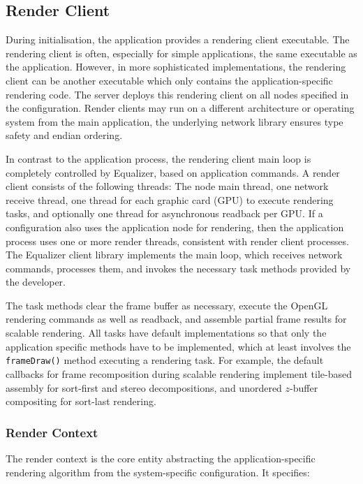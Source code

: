 \subsection{Render Client}

During initialisation, the application provides a rendering client executable.
The rendering client is often, especially for simple applications, the same
executable as the application. However, in more sophisticated implementations,
the rendering client can be another executable which only contains the
application-specific rendering code. The server deploys this rendering client
on all nodes specified in the configuration. Render clients may run on a
different architecture or operating system from the main application, the
underlying network library ensures type safety and endian ordering.

In contrast to the application process, the rendering client main loop is
completely controlled by Equalizer, based on application commands. A render
client consists of the following threads: The node main thread, one network
receive thread, one thread for each graphic card (GPU) to execute rendering
tasks, and optionally one thread for asynchronous readback per GPU. If a
configuration also uses the application node for rendering, then the
application process uses one or more render threads, consistent with render
client processes. The Equalizer client library implements the main loop, which
receives network commands, processes them, and invokes the necessary task
methods provided by the developer.

The task methods clear the frame buffer as necessary, execute the OpenGL
rendering commands as well as readback, and assemble partial frame results for
scalable rendering. All tasks have default implementations so that only the
application specific methods have to be implemented, which at least involves
the {\tt frameDraw()} method executing a rendering task. For example, the
default callbacks for frame recomposition during scalable rendering implement
tile-based assembly for sort-first and stereo decompositions, and unordered
$z$-buffer compositing for sort-last rendering.

\subsubsection{Render Context}

The render context is the core entity abstracting the application-specific
rendering algorithm from the system-specific configuration. It specifies:

